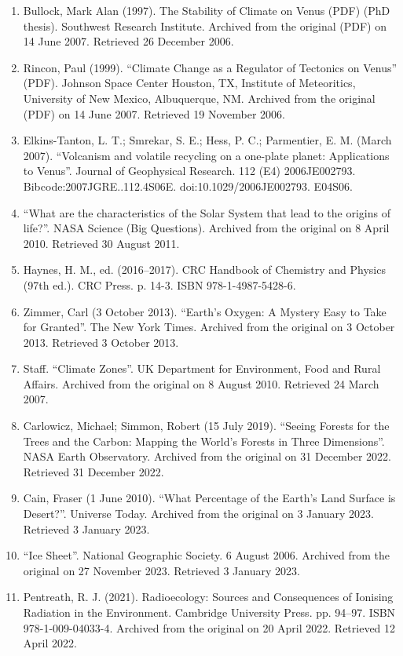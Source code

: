 \begin{enumerate}
\item Bullock, Mark Alan (1997). The Stability of Climate on Venus (PDF) (PhD thesis). Southwest Research Institute. Archived from the original (PDF) on 14 June 2007. Retrieved 26 December 2006.
\item Rincon, Paul (1999). ``Climate Change as a Regulator of Tectonics on Venus'' (PDF). Johnson Space Center Houston, TX, Institute of Meteoritics, University of New Mexico, Albuquerque, NM. Archived from the original (PDF) on 14 June 2007. Retrieved 19 November 2006.
\item Elkins-Tanton, L. T.; Smrekar, S. E.; Hess, P. C.; Parmentier, E. M. (March 2007). ``Volcanism and volatile recycling on a one-plate planet: Applications to Venus''. Journal of Geophysical Research. 112 (E4) 2006JE002793. Bibcode:2007JGRE..112.4S06E. doi:10.1029/2006JE002793. E04S06.
\item ``What are the characteristics of the Solar System that lead to the origins of life?''. NASA Science (Big Questions). Archived from the original on 8 April 2010. Retrieved 30 August 2011.
\item Haynes, H. M., ed. (2016–2017). CRC Handbook of Chemistry and Physics (97th ed.). CRC Press. p. 14-3. ISBN 978-1-4987-5428-6.
\item Zimmer, Carl (3 October 2013). ``Earth's Oxygen: A Mystery Easy to Take for Granted''. The New York Times. Archived from the original on 3 October 2013. Retrieved 3 October 2013.
\item Staff. ``Climate Zones''. UK Department for Environment, Food and Rural Affairs. Archived from the original on 8 August 2010. Retrieved 24 March 2007.
\item Carlowicz, Michael; Simmon, Robert (15 July 2019). ``Seeing Forests for the Trees and the Carbon: Mapping the World's Forests in Three Dimensions''. NASA Earth Observatory. Archived from the original on 31 December 2022. Retrieved 31 December 2022.
\item Cain, Fraser (1 June 2010). ``What Percentage of the Earth's Land Surface is Desert?''. Universe Today. Archived from the original on 3 January 2023. Retrieved 3 January 2023.
\item ``Ice Sheet''. National Geographic Society. 6 August 2006. Archived from the original on 27 November 2023. Retrieved 3 January 2023.
\item Pentreath, R. J. (2021). Radioecology: Sources and Consequences of Ionising Radiation in the Environment. Cambridge University Press. pp. 94–97. ISBN 978-1-009-04033-4. Archived from the original on 20 April 2022. Retrieved 12 April 2022.

\end{enumerate}

